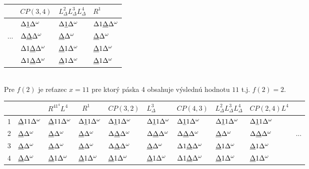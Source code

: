 \documentclass[11pt,a4paper]{article}
\newcommand{\D}{\Delta}
\newcommand{\EOT}{\Delta^\omega} %
\newcommand{\UL}[1]{\underbar{$#1$}} %
\begin{document}
\begin{flushright}
  \begin{tabular}{r|l|l|l}
        &\tiny{$CP(3,4)$}    & \tiny{$L^2_\D L^3_\D L^4_\D$} & \tiny{$R^1$}        \\\hline
        &$\D \UL{1} \EOT$    & $\D \UL{1} \EOT$              & $\D 1 \UL{\D} \EOT$ \\
    ... &$\D \UL{\D} \EOT$   & $\UL{\D} \EOT$                & $\UL{\D} \EOT$      \\
        &$\D 1 \UL{\D} \EOT$ & $\UL{\D} 1 \EOT$              & $\UL{\D} 1 \EOT$    \\
        &$\D 1 \UL{\D} \EOT$ & $\UL{\D} 1 \EOT$              & $\UL{\D} 1 \EOT$    \\
  \end{tabular}
\end{flushright}

\hfill\\[-1em]

Pre $f(2)$ je reťazec $x = 11$ pre ktorý páska 4 obsahuje výslednú hodnotu $11$ t.j. $f(2)=2$.\\[-0.5em]

\begin{tabular}{r|l|l|l|l|l|l|l|l|l}
    &                    &\tiny{$R^41^4L^4$}  & \tiny{$R^1$}       & \tiny{$CP(3,2)$}   & \tiny{$L^3_\D$}    & \tiny{$CP(4,3)$}    &\tiny{$L^2_\D L^3_\D L^4_\D$}& \tiny{$CP(2,4)L^4$} & \\\hline
  1 & $\UL{\D} 1 1 \EOT$ & $\UL{\D} 1 1 \EOT$ & $\D \UL{1} 1 \EOT$ & $\D \UL{1} 1 \EOT$ & $\D \UL{1} 1 \EOT$ & $\D \UL{1} 1 \EOT$  & $\D \UL{1} 1 \EOT$          & $\D \UL{1} 1 \EOT$  & \\
  2 & $\UL{\D} \EOT$     & $\UL{\D} \EOT$     & $\UL{\D} \EOT$     & $\D \UL{\D} \EOT$  & $\D \UL{\D} \EOT$  & $\D \UL{\D} \EOT$   & $\UL{\D} \EOT$              & $\D \UL{\D} \EOT$   & ... \\
  3 & $\UL{\D} \EOT$     & $\UL{\D} \EOT$     & $\UL{\D} \EOT$     & $\D \UL{\D} \EOT$  & $\UL{\D} \EOT$     & $\D 1 \UL{\D} \EOT$ & $\UL{\D} 1 \EOT$            & $\UL{\D} 1 \EOT$    & \\
  4 & $\UL{\D} \EOT$     & $\UL{\D} 1 \EOT$   & $\UL{\D} 1 \EOT$   & $\UL{\D} 1 \EOT$   & $\UL{\D} 1 \EOT$   & $\D 1 \UL{\D} \EOT$ & $\UL{\D} 1 \EOT$            & $\UL{\D} 1 \EOT$    & \\
\end{tabular}
\end{document}
